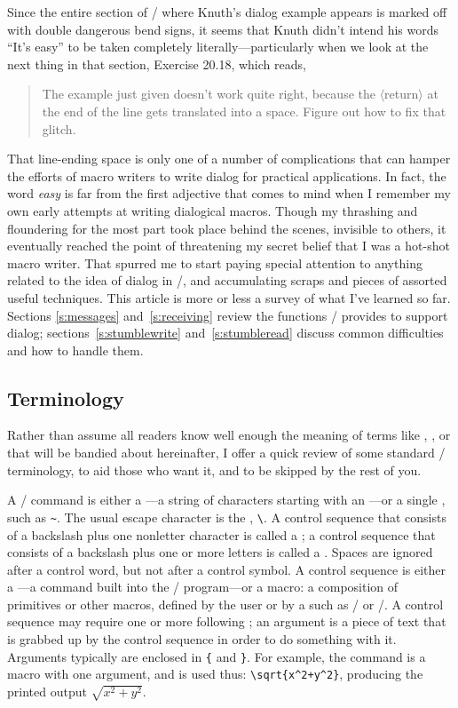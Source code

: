 Since the entire section of \texbook/ where Knuth's dialog example appears
is marked off with double dangerous bend signs, it seems that Knuth
didn't intend his words ``It's easy'' to be taken completely
literally---particularly when we look at the next thing in that
section, Exercise 20.18, which reads,
  \begin{quote}
  The  example just given doesn't work quite right, because the
  $\langle$return$\rangle$ at the end of the line gets translated
  into a space.  Figure out how to fix that glitch.
  \end{quote}
That line-ending space is only one of a number of complications that
can hamper the efforts of macro writers to write dialog for practical
applications.  In fact, the word {\em easy} is far from the first
adjective that comes to mind when I remember my own early attempts at
writing dialogical macros. Though my thrashing and floundering for
the most part took place behind the scenes, invisible to others, it
eventually reached the point of threatening my secret belief that I
was a hot-shot macro writer. That spurred me to start paying special
attention to anything related to the idea of dialog in \tex/, and
accumulating scraps and  pieces of assorted useful techniques. This
article is more or less a survey of what I've learned so far.
Sections \ref{s:messages} and~\ref{s:receiving} review the functions
\tex/ provides to support dialog; sections~\ref{s:stumblewrite}
and~\ref{s:stumbleread} discuss common difficulties and how to handle
them.

\subsection{Terminology}
Rather than assume all readers know well enough the meaning of terms
like , , or  that will
be bandied about hereinafter, I offer a quick review of some standard
\tex/ terminology, to aid those who want it, and to be skipped by the
rest of you.

A \tex/ command is either a ---a string of
characters starting with an ---or a single
, such as \verb|~|. The usual escape character
is the , \verb|\|. A control sequence that consists of
a backslash plus one nonletter character is called a ; a control sequence that consists of a backslash plus one or
more letters is called a . Spaces are ignored after
a control word, but not after a control symbol. A control sequence is
either a ---a command built into the \tex/
program---or a macro: a composition of primitives or other macros,
defined by the user or by a  such as \latex/ or
\plaintex/. A control sequence may require one or more following
; an argument is a piece of text that is grabbed up by
the control sequence in order to do something with it. Arguments
typically are enclosed in  \verb|{| and \verb|}|.
For example, the command  is a macro with one argument, and
is used thus: \verb|\sqrt{x^2+y^2}|, producing the printed output
$\sqrt{x^2+y^2}$.


